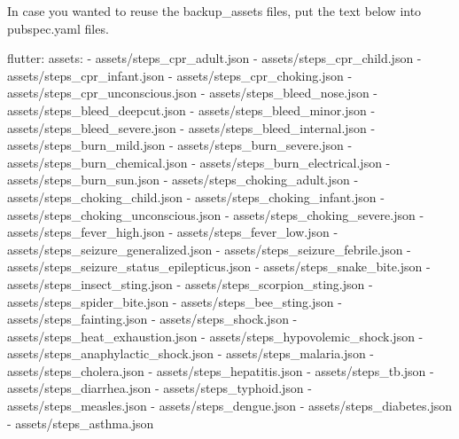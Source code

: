 In case you wanted to reuse the backup_assets files, put the text below into pubspec.yaml files.

flutter:
  assets:
    - assets/steps_cpr_adult.json
    - assets/steps_cpr_child.json
    - assets/steps_cpr_infant.json
    - assets/steps_cpr_choking.json
    - assets/steps_cpr_unconscious.json
    - assets/steps_bleed_nose.json
    - assets/steps_bleed_deepcut.json
    - assets/steps_bleed_minor.json
    - assets/steps_bleed_severe.json
    - assets/steps_bleed_internal.json
    - assets/steps_burn_mild.json
    - assets/steps_burn_severe.json
    - assets/steps_burn_chemical.json
    - assets/steps_burn_electrical.json
    - assets/steps_burn_sun.json
    - assets/steps_choking_adult.json
    - assets/steps_choking_child.json
    - assets/steps_choking_infant.json
    - assets/steps_choking_unconscious.json
    - assets/steps_choking_severe.json
    - assets/steps_fever_high.json
    - assets/steps_fever_low.json
    - assets/steps_seizure_generalized.json
    - assets/steps_seizure_febrile.json
    - assets/steps_seizure_status_epilepticus.json
    - assets/steps_snake_bite.json
    - assets/steps_insect_sting.json
    - assets/steps_scorpion_sting.json
    - assets/steps_spider_bite.json
    - assets/steps_bee_sting.json
    - assets/steps_fainting.json
    - assets/steps_shock.json
    - assets/steps_heat_exhaustion.json
    - assets/steps_hypovolemic_shock.json
    - assets/steps_anaphylactic_shock.json
    - assets/steps_malaria.json
    - assets/steps_cholera.json
    - assets/steps_hepatitis.json
    - assets/steps_tb.json
    - assets/steps_diarrhea.json
    - assets/steps_typhoid.json
    - assets/steps_measles.json
    - assets/steps_dengue.json
    - assets/steps_diabetes.json
    - assets/steps_asthma.json
